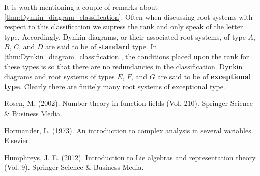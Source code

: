 \documentclass[12pt,reqno,oneside]{amsart}
\begin{document}
    It is worth mentioning a couple of remarks about \cref{thm:Dynkin_diagram_classification}. Often when discussing root systems with respect to this classification we supress the rank and only speak of the letter type. Accordingly, Dynkin diagrams, or their associated root systems, of type $A$, $B$, $C$, and $D$ are said to be of \textbf{standard} type. In \cref{thm:Dynkin_diagram_classification}, the conditions placed upon the rank for these types is so that there are no redundancies in the classification. Dynkin diagrams and root systems of types $E$, $F$, and $G$ are said to be of \textbf{exceptional type}. Clearly there are finitely many root systems of exceptional type.

\begin{thebibliography}{99}
    Rosen, M. (2002). Number theory in function fields (Vol. 210). Springer Science \& Business Media.

    Hormander, L. (1973). An introduction to complex analysis in several variables. Elsevier.

    Humphreys, J. E. (2012). Introduction to Lie algebras and representation theory (Vol. 9). Springer Science \& Business Media.

\end{thebibliography}
\end{document}
